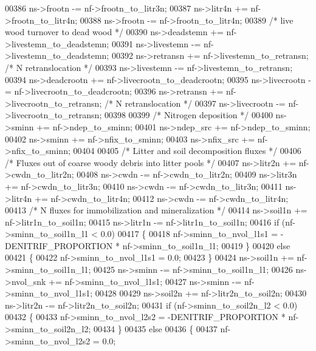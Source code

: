 \begin{DoxyCode}
{00386     ns->frootn     -= nf->frootn\_to\_litr3n;
00387     ns->litr4n     += nf->frootn\_to\_litr4n;
00388     ns->frootn     -= nf->frootn\_to\_litr4n;
00389     \textcolor{comment}{/* live wood turnover to dead wood */}
00390     ns->deadstemn  += nf->livestemn\_to\_deadstemn;
00391     ns->livestemn  -= nf->livestemn\_to\_deadstemn;
00392     ns->retransn   += nf->livestemn\_to\_retransn;   \textcolor{comment}{/* N retranslocation */}
00393     ns->livestemn  -= nf->livestemn\_to\_retransn;
00394     ns->deadcrootn += nf->livecrootn\_to\_deadcrootn;
00395     ns->livecrootn -= nf->livecrootn\_to\_deadcrootn;
00396     ns->retransn   += nf->livecrootn\_to\_retransn;   \textcolor{comment}{/* N retranslocation */}
00397     ns->livecrootn -= nf->livecrootn\_to\_retransn;
00398 
00399     \textcolor{comment}{/* Nitrogen deposition */}
00400     ns->sminn      += nf->ndep\_to\_sminn;
00401     ns->ndep\_src   += nf->ndep\_to\_sminn;
00402     ns->sminn      += nf->nfix\_to\_sminn;
00403     ns->nfix\_src   += nf->nfix\_to\_sminn;
00404     
00405     \textcolor{comment}{/* Litter and soil decomposition fluxes */}
00406     \textcolor{comment}{/* Fluxes out of coarse woody debris into litter pools */}
00407     ns->litr2n     += nf->cwdn\_to\_litr2n;
00408     ns->cwdn       -= nf->cwdn\_to\_litr2n;
00409     ns->litr3n     += nf->cwdn\_to\_litr3n;
00410     ns->cwdn       -= nf->cwdn\_to\_litr3n;
00411     ns->litr4n     += nf->cwdn\_to\_litr4n;
00412     ns->cwdn       -= nf->cwdn\_to\_litr4n;
00413     \textcolor{comment}{/* N fluxes for immobilization and mineralization */}
00414     ns->soil1n     += nf->litr1n\_to\_soil1n;
00415     ns->litr1n     -= nf->litr1n\_to\_soil1n;
00416     \textcolor{keywordflow}{if} (nf->sminn\_to\_soil1n\_l1 < 0.0)
00417     \{
00418         nf->sminn\_to\_nvol\_l1s1 = -DENITRIF\_PROPORTION * nf->sminn\_to\_soil1n\_l1;
00419     \}
00420     \textcolor{keywordflow}{else}
00421     \{
00422         nf->sminn\_to\_nvol\_l1s1 = 0.0;
00423     \}
00424     ns->soil1n     += nf->sminn\_to\_soil1n\_l1;
00425     ns->sminn      -= nf->sminn\_to\_soil1n\_l1;
00426     ns->nvol\_snk   += nf->sminn\_to\_nvol\_l1s1;
00427     ns->sminn      -= nf->sminn\_to\_nvol\_l1s1;
00428     
00429     ns->soil2n     += nf->litr2n\_to\_soil2n;
00430     ns->litr2n     -= nf->litr2n\_to\_soil2n;
00431     \textcolor{keywordflow}{if} (nf->sminn\_to\_soil2n\_l2 < 0.0)
00432     \{
00433         nf->sminn\_to\_nvol\_l2s2 = -DENITRIF\_PROPORTION * nf->sminn\_to\_soil2n\_l2;
00434     \}
00435     \textcolor{keywordflow}{else}
00436     \{
00437         nf->sminn\_to\_nvol\_l2s2 = 0.0;
}
\end{DoxyCode}
